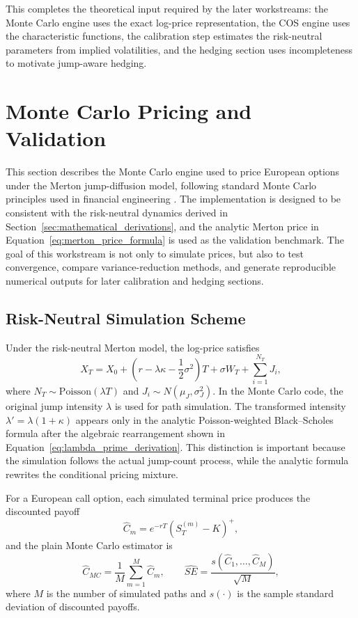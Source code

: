 \documentclass[12pt]{article}
\begin{document}
This completes the theoretical input required by the later workstreams: the Monte Carlo engine uses the exact log-price representation, the COS engine uses the characteristic functions, the calibration step estimates the risk-neutral parameters from implied volatilities, and the hedging section uses incompleteness to motivate jump-aware hedging.

\newpage
\section*{Monte Carlo Pricing and Validation}
\label{sec:monte_carlo}

This section describes the Monte Carlo engine used to price European options under the Merton jump-diffusion model, following standard Monte Carlo principles used in financial engineering \citep{Glasserman2004}. The implementation is designed to be consistent with the risk-neutral dynamics derived in Section~\ref{sec:mathematical_derivations}, and the analytic Merton price in Equation~\eqref{eq:merton_price_formula} is used as the validation benchmark. The goal of this workstream is not only to simulate prices, but also to test convergence, compare variance-reduction methods, and generate reproducible numerical outputs for later calibration and hedging sections.

\subsection*{Risk-Neutral Simulation Scheme}

Under the risk-neutral Merton model, the log-price satisfies
\begin{equation}
X_T = X_0 + \left(r-\lambda\kappa-\frac12\sigma^2\right)T
+\sigma W_T + \sum_{i=1}^{N_T}J_i,
\label{eq:w3_terminal_logprice}
\end{equation}
where $N_T\sim \mathrm{Poisson}(\lambda T)$ and $J_i\sim N(\mu_J,\sigma_J^2)$. In the Monte Carlo code, the original jump intensity $\lambda$ is used for path simulation. The transformed intensity $\lambda'=\lambda(1+\kappa)$ appears only in the analytic Poisson-weighted Black--Scholes formula after the algebraic rearrangement shown in Equation~\eqref{eq:lambda_prime_derivation}. This distinction is important because the simulation follows the actual jump-count process, while the analytic formula rewrites the conditional pricing mixture.

For a European call option, each simulated terminal price produces the discounted payoff
\begin{equation}
\widehat{C}_m=e^{-rT}(S_T^{(m)}-K)^+,
\end{equation}
and the plain Monte Carlo estimator is
\begin{equation}
\widehat{C}_{MC}=\frac1M\sum_{m=1}^{M}\widehat{C}_m,
\qquad
\widehat{SE}=\frac{s(\widehat{C}_1,\ldots,\widehat{C}_M)}{\sqrt{M}},
\label{eq:w3_plain_mc}
\end{equation}
where $M$ is the number of simulated paths and $s(\cdot)$ is the sample standard deviation of discounted payoffs.
\end{document}
